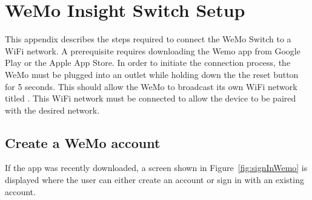\chapter{WeMo Insight Switch Setup}
\label{ap: appendixC}

This appendix describes the steps required to connect the WeMo Switch to a WiFi network. A prerequisite requires downloading the Wemo app from Google Play or the Apple App Store. In order to initiate the connection process, the WeMo must be plugged into an outlet while holding down the the reset button for 5 seconds. This should allow the WeMo to broadcast its own WiFi network titled . This WiFi network must be connected to allow the device to be paired with the desired network.

\section{Create a WeMo account}
If the app was recently downloaded, a screen shown in Figure~\ref{fig:signInWemo} is displayed where the user can either create an account or sign in with an existing account.
